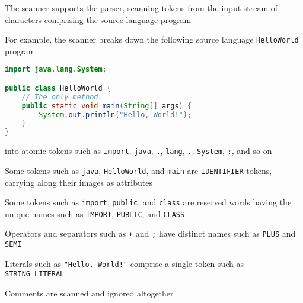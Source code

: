 \documentclass[8pt,a4paper,compress]{beamer}
\begin{document}
\begin{frame}[fragile]
\pause

The scanner supports the parser, scanning tokens from the input stream of characters comprising the source language program

\pause
\bigskip

For example, the scanner breaks down the following source language \lstinline{HelloWorld} program

\begin{lstlisting}[language=Java]
import java.lang.System;

public class HelloWorld {
    // The only method.
    public static void main(String[] args) {
        System.out.println("Hello, World!");
    }
}
\end{lstlisting}

into atomic tokens such as \lstinline{import}, \lstinline{java}, \lstinline{.}, \lstinline{lang}, \lstinline{.}, \lstinline{System}, \lstinline{;}, and so on

\pause
\bigskip

Some tokens such as \lstinline{java}, \lstinline{HelloWorld}, and \lstinline{main} are \lstinline{IDENTIFIER} tokens, carrying along their images as attributes

\pause
\bigskip

Some tokens such as \lstinline{import}, \lstinline{public}, and \lstinline{class} are reserved words having the unique names such as \lstinline{IMPORT}, \lstinline{PUBLIC}, and \lstinline{CLASS}

\pause
\bigskip

Operators and separators such as \lstinline{+} and \lstinline{;} have distinct names such as \lstinline{PLUS} and \lstinline{SEMI}

\pause
\bigskip

Literals such as \lstinline{"Hello, World!"} comprise a single token such as \lstinline{STRING_LITERAL}

\pause
\bigskip

Comments are scanned and ignored altogether
\end{frame}
\end{document}
